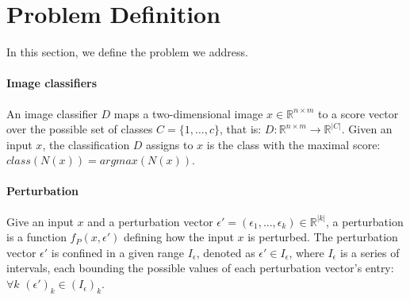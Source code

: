 
\section{Problem Definition}
In this section, we define the problem we address.

\paragraph{Image classifiers}
An image classifier $D$ maps a two-dimensional image $x\in \mathbb{R}^{n \times m}$ to a score vector over the possible set of classes $C=\{1,\ldots,c\}$, that is:
$D: \mathbb{R}^{n \times m} \rightarrow {\mathbb{R}}^{|C|}$.
Given an input $x$, the classification $D$ assigns to $x$ is the class with the maximal score: $class(N(x))=argmax(N(x))$.

\paragraph{Perturbation}
Give an input $x$ and a perturbation vector $\epsilon'=(\epsilon_1,...,\epsilon_k)\in{\mathbb{R}}^{|k|}$, a perturbation is a function $f_P(x,\epsilon')$ defining how the input $x$ is perturbed. The perturbation vector $\epsilon'$ is confined in a given range $I_\epsilon$, denoted as $\epsilon'\in I_\epsilon$, where $I_\epsilon$ is a series of intervals, each bounding the possible values of each perturbation vector's entry: $\forall{k}$ $(\epsilon')_k\in (I_\epsilon)_k$.

